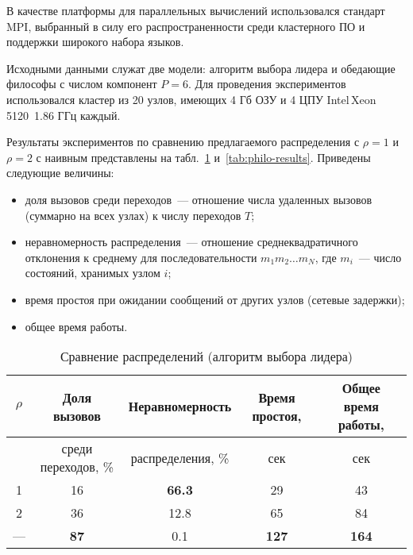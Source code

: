 \documentclass[12pt,a4paper,fleqn]{article}
\begin{document}
В качестве платформы для параллельных вычислений использовался стандарт MPI, выбранный в силу его распространенности
среди кластерного ПО и поддержки широкого набора языков.

Исходными данными служат две модели: алгоритм выбора лидера и обедающие философы с числом компонент $P = 6$. Для проведения
экспериментов использовался кластер из 20 узлов, имеющих 4 Гб ОЗУ и 4 ЦПУ Intel\,Xeon\,5120~1.86 ГГц каждый.

Результаты экспериментов по сравнению предлагаемого распределения с $\rho = 1$ и $\rho = 2$ с наивным представлены на
табл.~\ref{tab:election-results} и~\ref{tab:philo-results}. Приведены следующие величины:

\begin{itemize}
\item доля вызовов среди переходов~--- отношение числа удаленных вызовов (суммарно на всех узлах) к числу переходов $T$;

\item неравномерность распределения~--- отношение среднеквадратичного отклонения к среднему для последовательности $m_1
  m_2 \ldots m_N$, где $m_i$~--- число состояний, хранимых узлом $i$;

\item время простоя при ожидании сообщений от других узлов (сетевые задержки);

\item общее время работы.
\end{itemize}

\begin{table}[htb]
  \centering
  \begin{tabular}{|c|c|c|c|c|}
    \hline
    $\rho$ & Доля вызовов        & Неравномерность   & Время простоя, & Общее время работы, \\ \hline
           & среди переходов, \% & распределения, \% & сек            & сек                 \\ \hline
    1      & 16                  & \textbf{66.3}     & 29             & 43                  \\ \hline
    2      & 36                  & 12.8              & 65             & 84                  \\ \hline
    ---    & \textbf{87}         & 0.1               & \textbf{127}   & \textbf{164}        \\ \hline
  \end{tabular}
  \caption{Сравнение распределений (алгоритм выбора лидера)}
  \label{tab:election-results}
\end{table}
\end{document}
